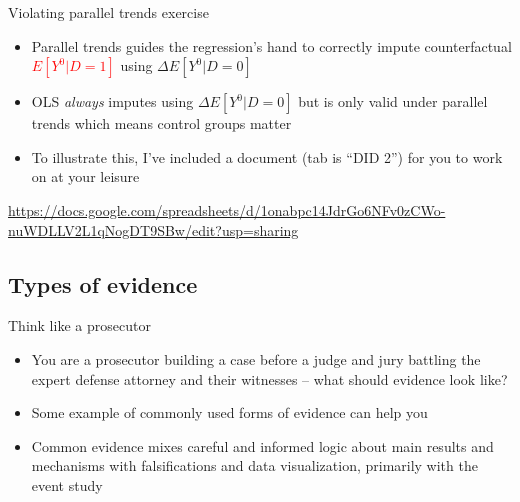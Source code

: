 \documentclass{beamer}
\begin{document}
\begin{frame}{Violating parallel trends exercise}

\begin{itemize}
\item Parallel trends guides the regression's hand to correctly impute counterfactual \textcolor{red}{$E[Y^0|D=1]$} using $\Delta E[Y^0|D=0]$ 
\item OLS \emph{always} imputes using $\Delta E[Y^0|D=0]$ but is only valid under parallel trends which means control groups matter
\item To illustrate this, I've included a document (tab is ``DID 2'') for you to work on at your leisure
\end{itemize}

\url{https://docs.google.com/spreadsheets/d/1onabpc14JdrGo6NFv0zCWo-nuWDLLV2L1qNogDT9SBw/edit?usp=sharing}

\end{frame}






\subsection{Types of evidence}

\begin{frame}{Think like a prosecutor}

\begin{itemize}
\item You are a prosecutor building a case before a judge and jury battling the expert defense attorney and their witnesses -- what should evidence look like?
\item Some example of commonly used forms of evidence can help you
\item Common evidence mixes careful and informed logic about main results and mechanisms with falsifications and data visualization, primarily with the event study
\end{itemize}

\end{frame}
\end{document}
